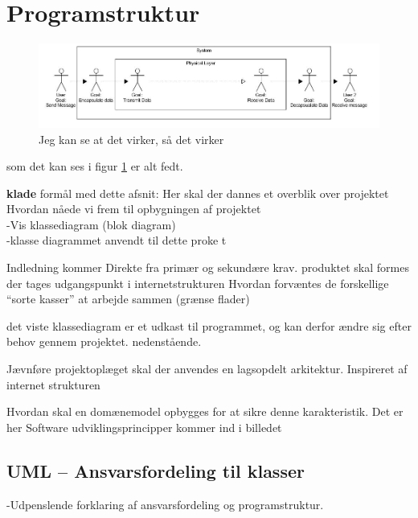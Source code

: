 \section{Programstruktur}



\begin{figure}[h]
\centering
\includegraphics[scale=0.5]{Billeder/ProgramOpbygning1.JPG}
\caption{Jeg kan se at det virker, så det virker}
\label{fig:Blokdiagram}
\end{figure}

som det kan ses i figur \ref{fig:Blokdiagram} er alt fedt. 


\textbf{klade}
formål med dette afsnit: Her skal der dannes et overblik over projektet
Hvordan nåede vi frem til opbygningen af projektet\\

-Vis klassediagram (blok diagram)\\
-klasse diagrammet anvendt til dette proke t

Indledning 
kommer Direkte fra primær og sekundære krav. 
produktet skal formes
der tages udgangspunkt i internetstrukturen
Hvordan forvæntes de forskellige “sorte kasser” at arbejde sammen (grænse flader)

det viste klassediagram er et udkast til programmet, og kan derfor ændre sig efter behov gennem projektet. nedenstående.

Jævnføre projektoplæget skal der anvendes en lagsopdelt arkitektur. 
Inspireret af internet strukturen

Hvordan skal en domænemodel opbygges for at sikre denne karakteristik. 
Det er her Software udviklingsprincipper kommer ind i billedet


\subsection{UML – Ansvarsfordeling til klasser}
-Udpenslende forklaring af ansvarsfordeling og programstruktur.  